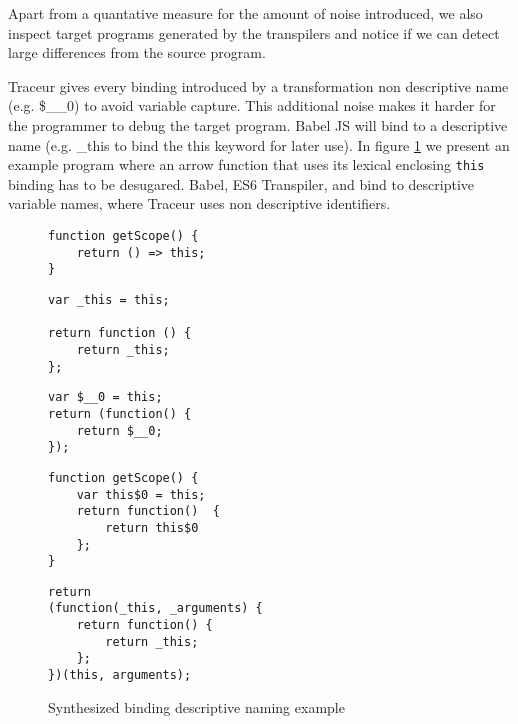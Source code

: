 Apart from a quantative measure for the amount of noise introduced, we also inspect target programs generated by the transpilers and notice if we can detect large differences from the source program.

Traceur gives every binding introduced by a transformation non descriptive name (e.g. \$\_\_0) to avoid variable capture. This additional noise makes it harder for the programmer to debug the target program. Babel JS will bind to a descriptive name (e.g. \_this to bind the this keyword for later use). In figure \ref{fig:noise} we present an example program where an arrow function that uses its lexical enclosing \lstinline$this$ binding has to be desugared. Babel, ES6 Transpiler, and \projectname bind to descriptive variable names, where Traceur uses non descriptive identifiers.

\begin{figure}
\caption{Synthesized binding descriptive naming example} \label{fig:noise}
\begin{lstlisting}
function getScope() {
	return () => this;
}
\end{lstlisting}

\begin{minipage}[t]{0.45\textwidth}
\begin{lstlisting}[caption=Babel JS]
var _this = this;

return function () {
	return _this;
};
\end{lstlisting}
\end{minipage}
\hfill
\begin{minipage}[t]{0.45\textwidth}
\begin{lstlisting}[caption=Traceur]
var $__0 = this;
return (function() {
	return $__0;
});
\end{lstlisting}
\end{minipage}

\begin{minipage}[t]{0.45\textwidth}
\begin{lstlisting}[caption=ES6 Transpiler]
function getScope() {
	var this$0 = this;
    return function()  {
    	return this$0
    };
}
\end{lstlisting}
\end{minipage}
\hfill
\begin{minipage}[t]{0.45\textwidth}
\begin{lstlisting}[caption=\projectname]
return 
(function(_this, _arguments) {
	return function() {
		return _this;
	};
})(this, arguments);
\end{lstlisting}
\end{minipage}
\end{figure}

